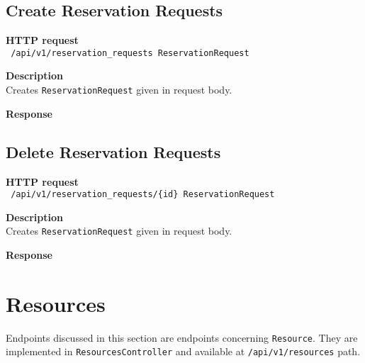 \subsection{Create Reservation Requests}
\begin{description}
    \item \textbf{HTTP request}\\
        \texttt{\text{[POST]} /api/v1/reservation\_requests \texttt{ReservationRequest}}
    \item \textbf{Description}\\
        Creates \texttt{ReservationRequest} given in request body.
    \item \textbf{Response}\\
        \texttt{\text{[200 OK]}}
\end{description}

\subsection{Delete Reservation Requests}
\begin{description}
    \item \textbf{HTTP request}\\
        \texttt{\text{[DELETE]} /api/v1/reservation\_requests/\{id\} \texttt{ReservationRequest}}
    \item \textbf{Description}\\
        Creates \texttt{ReservationRequest} given in request body.
    \item \textbf{Response}\\
        \texttt{\text{[200 OK]}}
\end{description}


\section{Resources}
Endpoints discussed in this section are endpoints concerning \texttt{Resource}.
They are implemented in \texttt{ResourcesController} and available at \texttt{/api/v1/resources} path.
